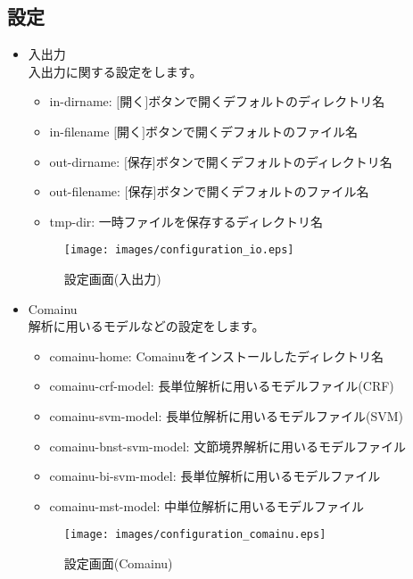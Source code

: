 \documentclass[titlepage]{jarticle}
\begin{document}
\subsection{設定}
\begin{itemize}
\item 入出力\\
入出力に関する設定をします。
\begin{itemize}
\item in-dirname: $[$開く$]$ボタンで開くデフォルトのディレクトリ名
\item in-filename $[$開く$]$ボタンで開くデフォルトのファイル名
\item out-dirname: $[$保存$]$ボタンで開くデフォルトのディレクトリ名
\item out-filename: $[$保存$]$ボタンで開くデフォルトのファイル名
\item tmp-dir: 一時ファイルを保存するディレクトリ名
\end{itemize}
\begin{figure}[!h]
\begin{center}
\texttt{[image: images/configuration\_io.eps]}
\caption{設定画面(入出力)}
\vspace{-5mm}
\label{configuration_io}
\end{center}
\end{figure}

\item Comainu\\
解析に用いるモデルなどの設定をします。
\begin{itemize}
\item comainu-home: Comainuをインストールしたディレクトリ名
\item comainu-crf-model: 長単位解析に用いるモデルファイル(CRF)
\item comainu-svm-model: 長単位解析に用いるモデルファイル(SVM)
\item comainu-bnst-svm-model: 文節境界解析に用いるモデルファイル
\item comainu-bi-svm-model: 長単位解析に用いるモデルファイル
\item comainu-mst-model: 中単位解析に用いるモデルファイル
\end{itemize}
\begin{figure}[!h]
\begin{center}
\texttt{[image: images/configuration\_comainu.eps]}
\caption{設定画面(Comainu)}
\vspace{-5mm}
\label{configuration_comainu}
\end{center}
\end{figure}


\end{itemize}
\end{document}
